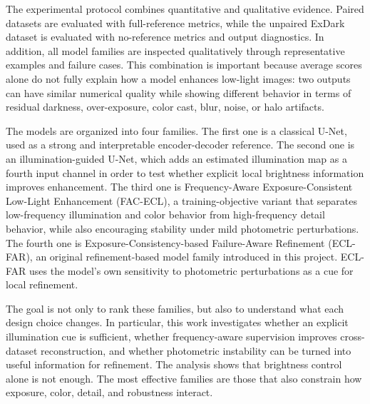 The experimental protocol combines quantitative and qualitative evidence. Paired datasets are evaluated with full-reference metrics, while the unpaired ExDark dataset is evaluated with no-reference metrics and output diagnostics. In addition, all model families are inspected qualitatively through representative examples and failure cases. This combination is important because average scores alone do not fully explain how a model enhances low-light images: two outputs can have similar numerical quality while showing different behavior in terms of residual darkness, over-exposure, color cast, blur, noise, or halo artifacts.

The models are organized into four families. The first one is a classical U-Net, used as a strong and interpretable encoder-decoder reference. The second one is an illumination-guided U-Net, which adds an estimated illumination map as a fourth input channel in order to test whether explicit local brightness information improves enhancement. The third one is Frequency-Aware Exposure-Consistent Low-Light Enhancement (FAC-ECL), a training-objective variant that separates low-frequency illumination and color behavior from high-frequency detail behavior, while also encouraging stability under mild photometric perturbations. The fourth one is Exposure-Consistency-based Failure-Aware Refinement (ECL-FAR), an original refinement-based model family introduced in this project. ECL-FAR uses the model's own sensitivity to photometric perturbations as a cue for local refinement.

The goal is not only to rank these families, but also to understand what each design choice changes. In particular, this work investigates whether an explicit illumination cue is sufficient, whether frequency-aware supervision improves cross-dataset reconstruction, and whether photometric instability can be turned into useful information for refinement. The analysis shows that brightness control alone is not enough. The most effective families are those that also constrain how exposure, color, detail, and robustness interact.

